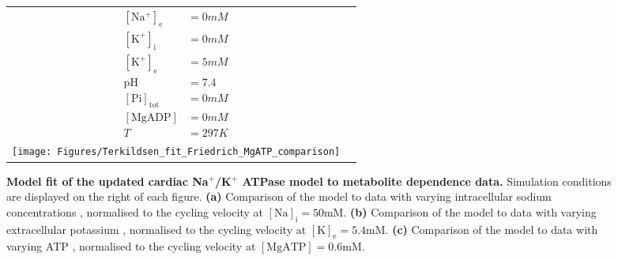 \documentclass[11pt]{article}
\begin{document}
\begin{figure}
\begin{tabular}{c c}
{\begin{minipage}{\linewidth}
\begin{align*}
				\mathrm{[Na^+]_e} &= 0\si{mM}\\ 
				\mathrm{[K^+]_i} &= 0\si{mM}\\ 
				\mathrm{[K^+]_e} &= 5\si{mM}\\ 
				\mathrm{pH} &= 7.4\\ 
				\mathrm{[Pi]_{tot}} &= 0\si{mM}\\ 
				\mathrm{[MgADP]} &= 0\si{mM}\\ 
				T &= 297\si{K}
				\end{align*}
		\end{minipage}}\\  
		\texttt{[image: Figures/Terkildsen\_fit\_Friedrich\_MgATP\_comparison]} & 
	\end{tabular}
	\caption{\textbf{Model fit of the updated cardiac Na$^+$/K$^+$ ATPase model to metabolite dependence data.} Simulation conditions are displayed on the right of each figure. \textbf{(a)} Comparison of the model to data with varying intracellular sodium concentrations \citep[Fig. 7(a)]{hansen_dependence_2002}, normalised to the cycling velocity at $\mathrm{[Na]_i = 50\si{mM}}$. \textbf{(b)} Comparison of the model to data with varying extracellular potassium \citep[Fig. 11(a)]{nakao_[na]_1989}, normalised to the cycling velocity at $\mathrm{[K]_e = 5.4\si{mM}}$. \textbf{(c) } Comparison of the model to data with varying ATP \citep[Fig. 3(b)]{friedrich_na+k+-atpase_1996}, normalised to the cycling velocity at $\mathrm{[MgATP] = 0.6\si{mM}}$.}
	\label{fig:metabolite_dependence}
\end{figure}
\end{document}
